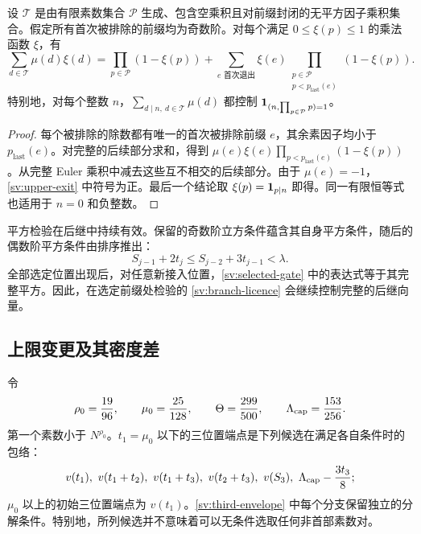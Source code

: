 \begin{lemma}[首次退出恒等式]\label{sv:first-exit}
设 $\mathcal T$ 是由有限素数集合 $\mathcal P$ 生成、包含空乘积且对前缀封闭的无平方因子乘积集合。假定所有首次被排除的前缀均为奇数阶。对每个满足 $0\le \xi(p)\le1$ 的乘法函数 $\xi$，有
\begin{equation}\label{sv:upper-exit}
 \sum_{d\in\mathcal T}\mu(d)\xi(d)
 =\prod_{p\in\mathcal P}(1-\xi(p))
 +\sum_{e\text{ 首次退出}}\xi(e)
           \prod_{\substack{p\in\mathcal P\\p<p_{\mathrm{last}}(e)}}
                            (1-\xi(p)).
\end{equation}
特别地，对每个整数 $n$，$\sum_{d\mid n,\ d\in\mathcal T}\mu(d)$ 都控制 $\mathbf 1_{(n,\prod_{p\in\mathcal P}p)=1}$。
\end{lemma}

\begin{proof}
每个被排除的除数都有唯一的首次被排除前缀 $e$，其余素因子均小于 $p_{\mathrm{last}}(e)$。对完整的后续部分求和，得到 $\mu(e)\xi(e)\prod_{p<p_{\mathrm{last}}(e)}(1-\xi(p))$。从完整 Euler 乘积中减去这些互不相交的后续部分。由于 $\mu(e)=-1$，\eqref{sv:upper-exit} 中符号为正。最后一个结论取 $\xi(p)=\mathbf 1_{p\mid n}$ 即得。同一有限恒等式也适用于 $n=0$ 和负整数。
\end{proof}

平方检验在后继中持续有效。保留的奇数阶立方条件蕴含其自身平方条件，随后的偶数阶平方条件由排序推出：
\begin{equation}\label{sv:descendant-square}
 S_{j-1}+2t_j\le S_{j-2}+3t_{j-1}<\lambda.
\end{equation}
全部选定位置出现后，对任意新接入位置，\eqref{sv:selected-gate} 中的表达式等于其完整平方。因此，在选定前缀处检验的 \eqref{sv:branch-licence} 会继续控制完整的后继向量。

\subsection{上限变更及其密度差}

令
\[
 \rho_0=\frac{19}{96},\qquad \mu_0=\frac{25}{128},\qquad
 \Theta=\frac{299}{500},\qquad \Lambda_{\rm cap}=\frac{153}{256}.
\]
第一个素数小于 $N^{\rho_0}$。$t_1=\mu_0$ 以下的三位置端点是下列候选在满足各自条件时的包络：
\begin{equation}\label{sv:third-envelope}
 v(t_1),\ v(t_1+t_2),\ v(t_1+t_3),\ v(t_2+t_3),\ v(S_3),\
                         \Lambda_{\rm cap}-\frac{3t_3}{8};
\end{equation}
$\mu_0$ 以上的初始三位置端点为 $v(t_1)$。\eqref{sv:third-envelope} 中每个分支保留独立的分解条件。特别地，所列候选并不意味着可以无条件选取任何非首部素数对。

